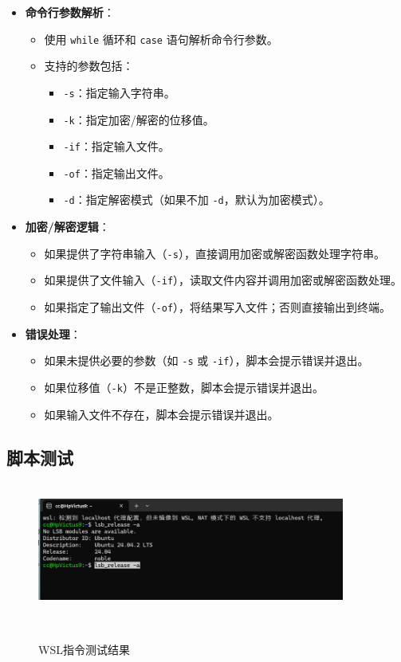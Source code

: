 \documentclass[12pt,hyperref,a4paper,UTF8]{ctexart}
\begin{document}
\begin{itemize}
    \item \textbf{命令行参数解析}：
    \begin{itemize}
        \item 使用 \texttt{while} 循环和 \texttt{case} 语句解析命令行参数。
        \item 支持的参数包括：
        \begin{itemize}
            \item \texttt{-s}：指定输入字符串。
            \item \texttt{-k}：指定加密/解密的位移值。
            \item \texttt{-if}：指定输入文件。
            \item \texttt{-of}：指定输出文件。
            \item \texttt{-d}：指定解密模式（如果不加 \texttt{-d}，默认为加密模式）。
        \end{itemize}
    \end{itemize}

    \item \textbf{加密/解密逻辑}：
    \begin{itemize}
        \item 如果提供了字符串输入（\texttt{-s}），直接调用加密或解密函数处理字符串。
        \item 如果提供了文件输入（\texttt{-if}），读取文件内容并调用加密或解密函数处理。
        \item 如果指定了输出文件（\texttt{-of}），将结果写入文件；否则直接输出到终端。
    \end{itemize}

    \item \textbf{错误处理}：
    \begin{itemize}
        \item 如果未提供必要的参数（如 \texttt{-s} 或 \texttt{-if}），脚本会提示错误并退出。
        \item 如果位移值（\texttt{-k}）不是正整数，脚本会提示错误并退出。
        \item 如果输入文件不存在，脚本会提示错误并退出。
    \end{itemize}
\end{itemize}

\subsection{脚本测试}



\begin{figure} %
        \centering
        \includegraphics[width=0.9\textwidth]{figures/201.png} %
        \caption{WSL指令测试结果} %
        \label{fig:example} %
\end{figure}
\end{document}
